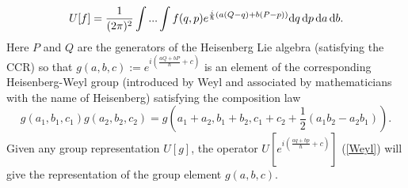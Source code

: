 \begin{equation}
\label{Weyl}
U [f] = \frac{1}{(2\pi)^2}\int ... \int f(q,p) e^{\frac{i}{\hbar}(a(Q-q) +b(P-p))} {\rm d}q\, {\rm d}p\, {\rm d}a\, {\rm d}b. 
\end{equation}
Here $P$ and $Q$ are the generators of the Heisenberg Lie algebra (satisfying the CCR) so that $g(a, b, c):= e^{i(\frac{aQ+bP}{\hbar} + c)}$ 
is an element of the corresponding Heisenberg-Weyl group (introduced by Weyl and associated by mathematicians with the name of Heisenberg)
satisfying the composition law
\begin{equation}
\label{compos}
g(a_1, b_1, c_1) g(a_2, b_2, c_2) = g(a_1 + a_2, b_1 + b_2, c_1 + c_2 + \frac{1}{2}(a_1 b_2 - a_2 b_1)).
\end{equation} 
Given any group representation $U [g]$, the operator $U [e^{i(\frac{aq+bp}{\hbar} + c)}]$ (\ref{Weyl}) will give the representation of the 
group element $g(a, b, c)$. 

